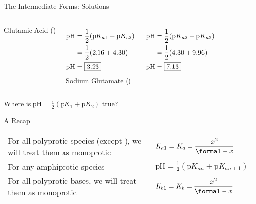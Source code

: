 \documentclass[notes=show]{beamer}
\begin{document}
\begin{frame}{The Intermediate Forms: Solutions}
	\begin{columns}
		{\color{fg} Glutamic Acid ()}

		\begin{align*}
			\text{pH} &= \frac{1}{2}(\text{p}K_{a1} +
			\text{p}K_{a2}) \\
			&= \frac{1}{2}(2.16 + 4.30) \\
			\text{pH} &= \fbox{3.23}
		\end{align*}
		{\color{fg} Sodium Glutamate ()}

		\begin{align*}
			\text{pH} &= \frac{1}{2}(\text{p}K_{a2} +
			\text{p}K_{a3}) \\
			&= \frac{1}{2}(4.30 + 9.96) \\
			\text{pH} &= \fbox{7.13}
		\end{align*}
	\end{columns}
\end{frame}

\begin{frame}{Where is $\text{pH} = \frac{1}{2} (\text{p}K_1 + \text{p}K_2)$
	true?}

	\begin{center}
		
	\end{center}
\end{frame}

\begin{frame}{A Recap}
	\renewcommand\arraystretch{2}
	\begin{tabularx}{\linewidth} {@{}X@{\qquad}l}
		For all polyprotic species (except \ch{H2SO4}), we will treat
		them as monoprotic & $K_{a1} = K_a =
		\dfrac{x^2}{\si{\formal}-x}$ \\
		For any amphiprotic species & $\text{pH} = \frac{1}{2}(\text{p}K_{an} +
		\text{p}K_{an+1})$\\
		For all polyprotic bases, we will treat them as monoprotic &
		$K_{b1} = K_b = \dfrac{x^2}{\si{\formal}-x}$
	\end{tabularx}
\end{frame}
\end{document}
